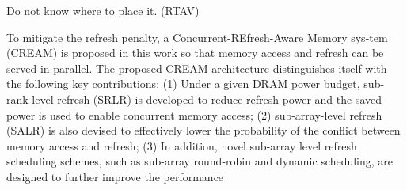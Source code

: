 Do not know where to place it. (RTAV)

To mitigate the refresh penalty, a Concurrent-REfresh-Aware Memory sys-tem (CREAM) is proposed in this work so that memory access and refresh can be served in parallel. The proposed CREAM architecture distinguishes itself with the following key contributions: (1) Under a given DRAM power budget,
sub-rank-level refresh (SRLR) is developed to reduce refresh power and the saved power is used to enable concurrent memory access; (2) sub-array-level refresh (SALR) is also devised to effectively lower the probability of the conflict between memory access and refresh; (3) In addition, novel sub-array level refresh scheduling schemes, such as sub-array round-robin and dynamic scheduling, are designed to further improve the performance
